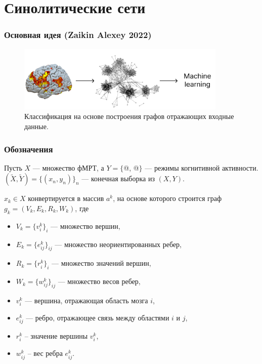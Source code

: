 \documentclass{beamer}
\makeatletter
\newcommand*{\rom}[1]{\expandafter\@slowromancap\romannumeral #1@}
\makeatother
\begin{document}
	\section{Синолитические сети}
	\begin{frame} 
		\frametitle{Основная идея (Zaikin Alexey 2022)}
		\begin{figure}
			\includegraphics[width=10cm]{../images/fmri_graph_ml_1.pdf}
			\caption{Классификация на основе построения графов отражающих входные данные.} 
			\label{fg:3}
		\end{figure}
	\end{frame}

	\begin{frame} 
		\frametitle{Обозначения}
		Пусть $X$ --- множество фМРТ, а $Y = \{$\rom{1}, \rom{2}$\}$ --- режимы когнитивной активности. $(\widetilde{X}, \widetilde{Y}) =  \{(x_{n}, y_{n})\}_n$ --- конечная выборка из $(X, Y)$.
		\vspace{0.5cm}
		
		$x_k \in X$ конвертируется в массив $a^k$, на основе которого строится граф $g_k = (V_k, E_k, R_k, W_k)$, где 
		\begin{itemize}
			\item $V_k = \{v_i^k\}_i$ --- множество вершин,
			\item $E_k = \{e_{ij}^k\}_{ij}$ --- множество неориентированных ребер,
			\item $R_k = \{r_i^k\}_i$ --- множество значений вершин,
			\item $W_k = \{w_{ij}^k\}_{ij}$ --- множество весов ребер,
			\item $v_i^k$ --- вершина, отражающая область мозга $i$,
			\item $e_{ij}^k$ --- ребро, отражающее связь между областями $i$ и $j$,
			\item $r_i^k$ -- значение вершины $v_i^k$,
			\item $w_{ij}^k$ -- вес ребра $e_{ij}^k$.
		\end{itemize}									
	\end{frame}
\end{document}
